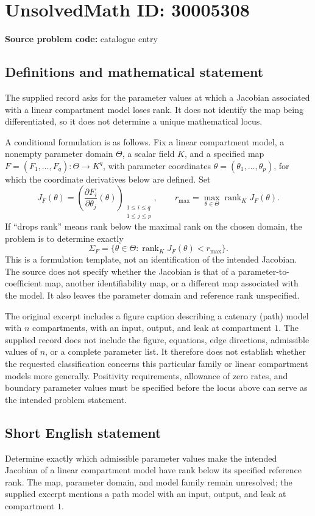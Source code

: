 \documentclass[11pt]{article}
\begin{document}
\section*{UnsolvedMath ID: 30005308}
\textbf{Source problem code:} catalogue entry
\subsection{Definitions and mathematical statement}
The supplied record asks for the parameter values at which a Jacobian associated with a linear compartment model loses rank. It does not identify the map being differentiated, so it does not determine a unique mathematical locus.

A conditional formulation is as follows. Fix a linear compartment model, a nonempty parameter domain \(\Theta\), a scalar field \(K\), and a specified map \(F=(F_1,\ldots,F_q):\Theta\to K^q\), with parameter coordinates \(\theta=(\theta_1,\ldots,\theta_p)\), for which the coordinate derivatives below are defined. Set
\[
J_F(\theta)=\left(\frac{\partial F_i}{\partial\theta_j}(\theta)\right)_{\substack{1\leq i\leq q\\1\leq j\leq p}},
\qquad
r_{\max}=\max_{\theta\in\Theta}\operatorname{rank}_{K}J_F(\theta).
\]
If ``drops rank'' means rank below the maximal rank on the chosen domain, the problem is to determine exactly
\[
\Sigma_F=\{\theta\in\Theta:\operatorname{rank}_{K}J_F(\theta)<r_{\max}\}.
\]
This is a formulation template, not an identification of the intended Jacobian. The source does not specify whether the Jacobian is that of a parameter-to-coefficient map, another identifiability map, or a different map associated with the model. It also leaves the parameter domain and reference rank unspecified.

The original excerpt includes a figure caption describing a catenary (path) model with \(n\) compartments, with an input, output, and leak at compartment \(1\). The supplied record does not include the figure, equations, edge directions, admissible values of \(n\), or a complete parameter list. It therefore does not establish whether the requested classification concerns this particular family or linear compartment models more generally. Positivity requirements, allowance of zero rates, and boundary parameter values must be specified before the locus above can serve as the intended problem statement.
\subsection{Short English statement}
Determine exactly which admissible parameter values make the intended Jacobian of a linear compartment model have rank below its specified reference rank. The map, parameter domain, and model family remain unresolved; the supplied excerpt mentions a path model with an input, output, and leak at compartment \(1\).
\end{document}
